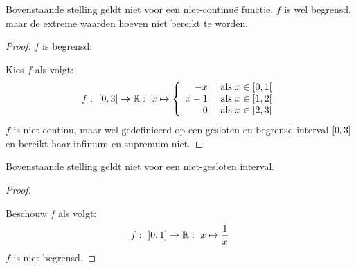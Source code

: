 \documentclass[main.tex]{subfiles}
\begin{document}
\begin{tvb}
  Bovenstaande stelling geldt niet voor een niet-continu\"e functie.
  $f$ is wel begrensd, maar de extreme waarden hoeven niet bereikt te worden.

  \begin{proof}
    $f$ is begrensd: 
    \begin{figure}[H]
      \centering
    \end{figure}
    Kies $f$ als volgt:
    \[
    f:\ \interval{0}{3} \rightarrow \mathbb{R}:\ x \mapsto
    \left\{
      \begin{array}{rl}
        -x & \text{ als } x \in \interval[open right]{0}{1}\\
        x-1 & \text{ als } x \in \interval[open right]{1}{2}\\
        0 & \text{ als } x \in \interval{2}{3}\\
      \end{array}
    \right.
    \]
    $f$ is niet continu, maar wel gedefinieerd op een gesloten en begrensd interval $\interval{0}{3}$ en bereikt haar infimum en supremum niet.
  \end{proof}
\end{tvb}

\begin{tvb}
  Bovenstaande stelling geldt niet voor een niet-gesloten interval.
  
  \begin{proof}
    \begin{figure}[H]
      \centering
    \end{figure}
    Beschouw $f$ als volgt:
    \[ f:\ \interval[open left]{0}{1} \rightarrow \mathbb{R}: \ x \mapsto \frac{1}{x} \]
    $f$ is niet begrensd.
  \end{proof}
\end{tvb}
\end{document}
